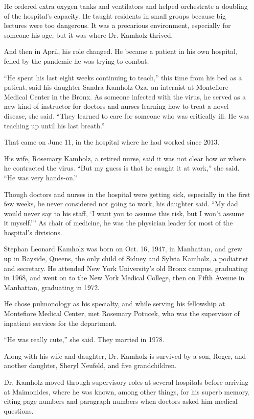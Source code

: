 He ordered extra oxygen tanks and ventilators and helped orchestrate a
doubling of the hospital's capacity. He taught residents in small groups
because big lectures were too dangerous. It was a precarious
environment, especially for someone his age, but it was where Dr.
Kamholz thrived.

And then in April, his role changed. He became a patient in his own
hospital, felled by the pandemic he was trying to combat.

``He spent his last eight weeks continuing to teach,'' this time from
his bed as a patient, said his daughter Sandra Kamholz Oza, an internist
at Montefiore Medical Center in the Bronx. As someone infected with the
virus, he served as a new kind of instructor for doctors and nurses
learning how to treat a novel disease, she said. ``They learned to care
for someone who was critically ill. He was teaching up until his last
breath.''

That came on June 11, in the hospital where he had worked since 2013.

His wife, Rosemary Kamholz, a retired nurse, said it was not clear how
or where he contracted the virus. ``But my guess is that he caught it at
work,'' she said. ``He was very hands-on.''

Though doctors and nurses in the hospital were getting sick, especially
in the first few weeks, he never considered not going to work, his
daughter said. ``My dad would never say to his staff, `I want you to
assume this risk, but I won't assume it myself.''' As chair of medicine,
he was the physician leader for most of the hospital's divisions.

Stephan Leonard Kamholz was born on Oct. 16, 1947, in Manhattan, and
grew up in Bayside, Queens, the only child of Sidney and Sylvia Kamholz,
a podiatrist and secretary. He attended New York University's old Bronx
campus, graduating in 1968, and went on to the New York Medical College,
then on Fifth Avenue in Manhattan, graduating in 1972.

He chose pulmonology as his specialty, and while serving his fellowship
at Montefiore Medical Center, met Rosemary Potucek, who was the
supervisor of inpatient services for the department.

``He was really cute,'' she said. They married in 1978.

Along with his wife and daughter, Dr. Kamholz is survived by a son,
Roger, and another daughter, Sheryl Neufeld, and five grandchildren.

Dr. Kamholz moved through supervisory roles at several hospitals before
arriving at Maimonides, where he was known, among other things, for his
superb memory, citing page numbers and paragraph numbers when doctors
asked him medical questions.

